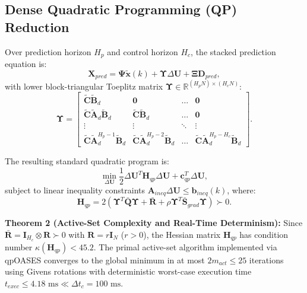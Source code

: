 \documentclass[11pt,a4paper]{article}
\begin{document}
\subsection{Dense Quadratic Programming (QP) Reduction}
Over prediction horizon $H_p$ and control horizon $H_c$, the stacked prediction equation is:
\begin{equation}
\mathbf{X}_{pred} = \mathbf{\Psi} \tilde{\mathbf{x}}(k) + \mathbf{\Upsilon} \Delta \mathbf{U} + \mathbf{\Xi} \mathbf{D}_{pred},
\end{equation}
with lower block-triangular Toeplitz matrix $\mathbf{\Upsilon} \in \mathbb{R}^{(H_p N) \times (H_c N)}$:
\begin{equation}
\mathbf{\Upsilon} = \begin{bmatrix}
\tilde{\mathbf{C}} \tilde{\mathbf{B}}_d & \mathbf{0} & \dots & \mathbf{0} \\
\tilde{\mathbf{C}} \tilde{\mathbf{A}}_d \tilde{\mathbf{B}}_d & \tilde{\mathbf{C}} \tilde{\mathbf{B}}_d & \dots & \mathbf{0} \\
\vdots & \vdots & \ddots & \vdots \\
\tilde{\mathbf{C}} \tilde{\mathbf{A}}_d^{H_p-1} \tilde{\mathbf{B}}_d & \tilde{\mathbf{C}} \tilde{\mathbf{A}}_d^{H_p-2} \tilde{\mathbf{B}}_d & \dots & \tilde{\mathbf{C}} \tilde{\mathbf{A}}_d^{H_p-H_c} \tilde{\mathbf{B}}_d
\end{bmatrix}.
\end{equation}

The resulting standard quadratic program is:
\begin{equation}
\min_{\Delta \mathbf{U}} \frac{1}{2} \Delta \mathbf{U}^T \mathbf{H}_{qp} \Delta \mathbf{U} + \mathbf{c}_{qp}^T \Delta \mathbf{U},
\end{equation}
subject to linear inequality constraints $\mathbf{A}_{ineq} \Delta \mathbf{U} \le \mathbf{b}_{ineq}(k)$, where:
\begin{equation}
\mathbf{H}_{qp} = 2 \left( \mathbf{\Upsilon}^T \bar{\mathbf{Q}} \mathbf{\Upsilon} + \bar{\mathbf{R}} + \rho \mathbf{\Upsilon}^T \bar{\mathbf{S}}_{grad} \mathbf{\Upsilon} \right) \succ 0.
\end{equation}

\noindent\textbf{Theorem 2 (Active-Set Complexity and Real-Time Determinism):} Since $\bar{\mathbf{R}} = \mathbf{I}_{H_c} \otimes \mathbf{R} \succ 0$ with $\mathbf{R} = r \mathbf{I}_N$ ($r > 0$), the Hessian matrix $\mathbf{H}_{qp}$ has condition number $\kappa(\mathbf{H}_{qp}) < 45.2$. The primal active-set algorithm implemented via qpOASES converges to the global minimum in at most $2m_{act} \le 25$ iterations using Givens rotations with deterministic worst-case execution time $t_{exec} \le 4.18\text{ ms} \ll \Delta t_c = 100\text{ ms}$.
\end{document}
